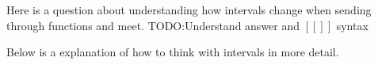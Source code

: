 \documentclass[twocolumn,a4paper]{article}
\begin{document}
Here is a question about understanding how intervals change when sending through functions and meet.
TODO:\@ Understand answer and \([[]]\) syntax

\begin{figure}[ht]
	\centering
	\vspace{-10pt}
	\vspace{-10pt}
\end{figure}

Below is a explanation of how to think with intervals in more detail.
\begin{figure}[ht]
	\centering
	\vspace{-10pt}
	\vspace{-30pt}
\end{figure}
\end{document}
